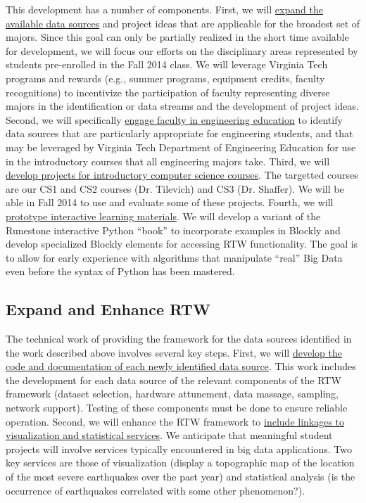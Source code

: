 \documentclass[11pt]{article}
\begin{document}
This development has a number of components. First, we will
\uline{expand the available data sources} and project ideas that are
applicable for the broadest set of majors. Since this goal can only be
partially realized in the short time available for development, we
will focus our efforts on the disciplinary areas represented by
students pre-enrolled in the Fall 2014 class.
We will leverage Virginia Tech programs and rewards (e.g., summer
programs, equipment credits, faculty recognitions) to incentivize the
participation of faculty representing diverse majors in the
identification or data streams and the development of project
ideas. Second, we will specifically \uline{engage faculty in engineering education} to identify data sources that are
particularly appropriate for engineering students, and that may be
leveraged by Virginia Tech Department of Engineering Education for use
in the introductory courses that all engineering majors take.
Third, we will \uline{develop projects for introductory computer science courses}.
The targetted courses are our CS1 and CS2 courses (Dr. Tilevich) and
CS3 (Dr. Shaffer). We will be able in Fall 2014 to
use and evaluate some of these projects. Fourth, we will
\uline{prototype interactive learning materials}.  We will develop a
variant of the Runestone interactive Python ``book'' to incorporate
examples in Blockly and develop specialized Blockly elements for
accessing RTW functionality. The goal is to allow for early experience
with algorithms that manipulate ``real'' Big Data even before the
syntax of Python has been mastered.

\subsection{Expand and Enhance RTW}

The technical work of providing the framework for the data sources
identified in the work described above involves several key
steps. First, we will \uline{develop the code and documentation of each newly identified data source}. This work includes the
development for each data source of the relevant components of the RTW
framework (dataset selection, hardware attunement, data massage,
sampling, network support). Testing of these components must be done
to ensure reliable operation. Second, we will enhance the RTW
framework to \uline{include linkages to visualization and statistical services}.
We anticipate that meaningful student projects will involve services typically encountered in big data applications. Two key services are those of visualization (display a topographic map of the location of the most severe earthquakes over the past year) and statistical analysis (is the occurrence of earthquakes correlated with some other phenomenon?).
\end{document}
